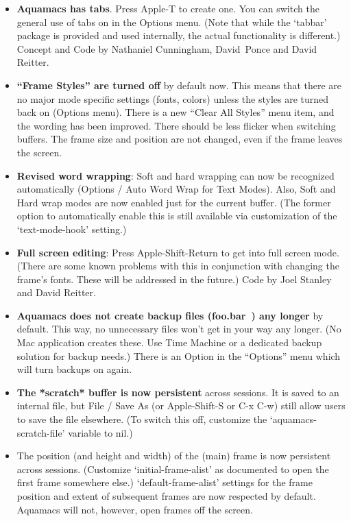 \begin{itemize}

\item \textbf{Aquamacs has tabs}. Press Apple-T to create one. You can switch the general use of tabs on in the Options menu. (Note that while the `tabbar' package is provided and used internally, the actual functionality is different.)
Concept and Code by Nathaniel Cunningham, David~Ponce and David Reitter.


\item \textbf{``Frame Styles'' are turned off} by default now. This means that there are no major mode specific settings (fonts, colors)  unless the styles are turned back on (Options menu).   There is a  new ``Clear All Styles'' menu item, and the wording has been improved. There should be less flicker when  switching buffers. The frame size and position are not changed,  even if the frame leaves the screen.

\item \textbf{Revised word wrapping}: Soft and hard wrapping can now be recognized automatically (Options / Auto Word Wrap for Text Modes). Also, Soft and Hard wrap modes are now enabled just for the current buffer.  (The former option to automatically enable this is still available via customization of the `text-mode-hook' setting.)

\item \textbf{Full screen editing}: Press Apple-Shift-Return to get into full screen mode. (There are some known problems with this in  conjunction with changing the frame's fonts. These will be addressed  in the future.)
Code by Joel Stanley and David Reitter. 

\item \textbf{Aquamacs does not create backup files (foo.bar~) any longer} by default. This way, no unnecessary files won't get in your way any longer. (No Mac application creates these. Use Time Machine or a dedicated backup solution for backup needs.) There is an Option in the ``Options'' menu which will turn backups on again. 

\item \textbf{The *scratch* buffer is now persistent} across sessions.
  It is saved to an internal file, but File / Save As  (or
  Apple-Shift-S or C-x C-w) still allow users to save the file elsewhere.
(To switch this off, customize the `aquamacs-scratch-file' variable to nil.)

\item The position (and height and width) of the (main) frame is now persistent across sessions.  (Customize `initial-frame-alist' as documented to open the first frame somewhere else.)  `default-frame-alist' settings for the frame position and extent of subsequent frames are now respected by default.  Aquamacs will not, however, open frames off the screen.


\end{itemize}
